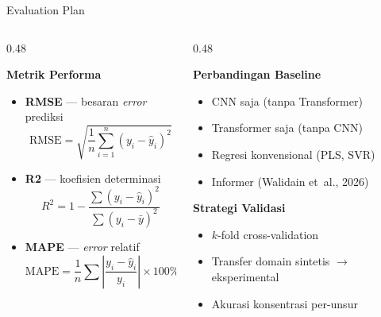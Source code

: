\documentclass{beamer}
\def\textsuperscript#1{#1}%
\begin{document}
\begin{frame}{Evaluation Plan}
  \begin{columns}[T,onlytextwidth]
    \begin{column}{0.48\textwidth}
      {\small
      \textbf{Metrik Performa}
      \begin{itemize}\setlength{\itemsep}{3pt}
        \item \textbf{RMSE} --- besaran \textit{error} prediksi
          \[ \text{RMSE} = \sqrt{\frac{1}{n}\sum_{i=1}^{n}(y_i - \hat{y}_i)^2} \]
        \item \textbf{R\textsuperscript{2}} --- koefisien determinasi
          \[ R^2 = 1 - \frac{\sum(y_i - \hat{y}_i)^2}{\sum(y_i - \bar{y})^2} \]
        \item \textbf{MAPE} --- \textit{error} relatif
          \[ \text{MAPE} = \frac{1}{n}\sum\left|\frac{y_i - \hat{y}_i}{y_i}\right| \times 100\% \]
      \end{itemize}
      }
    \end{column}
    \begin{column}{0.48\textwidth}
      {\small
      \textbf{Perbandingan Baseline}
      \begin{itemize}\setlength{\itemsep}{3pt}
        \item CNN saja (tanpa Transformer)
        \item Transformer saja (tanpa CNN)
        \item Regresi konvensional (PLS, SVR)
        \item Informer (Walidain et~al., 2026)
      \end{itemize}

      \vspace{0.4em}
      \textbf{Strategi Validasi}
      \begin{itemize}\setlength{\itemsep}{3pt}
        \item $k$-fold cross-validation
        \item Transfer domain sintetis $\rightarrow$ eksperimental
        \item Akurasi konsentrasi per-unsur
      \end{itemize}
      }
    \end{column}
  \end{columns}
\end{frame}
\end{document}
